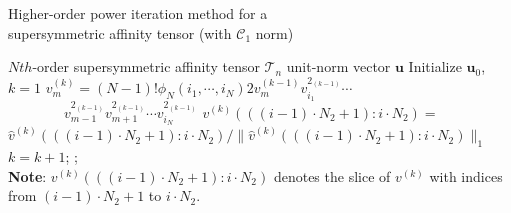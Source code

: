 \begin{algorithm}[!t]
\caption{\small Higher-order power iteration method for a \protect\\
         \mbox{}\hspace{15ex}\small supersymmetric affinity tensor (with $\mathcal{C}_1$ norm)}
\label{alg2}
\begin{algorithmic}[1]
\REQUIRE \small $Nth$-order supersymmetric affinity tensor $\mathcal{T}_n$
\ENSURE  \small unit-norm vector $\boldsymbol{u}$
\STATE   \small \; Initialize $\boldsymbol{u}_0$, $k=1$
\REPEAT
        \STATE $v_{m}^{(k)}=(N-1)!\phi_N(i_1,\cdots , i_N) 2v_{m}^{(k-1)}v_{i_1}^{2_{(k-1)}}\cdots$ \\
                 $\qquad \qquad v_{m-1}^{2_{(k-1)}}v_{m+1}^{2_{(k-1)}}\cdots v_{i_N}^{2_{(k-1)}}$
        \ENDFOR
        \STATE $v^{(k)}(((i-1)\cdot N_2+1) : i\cdot N_2)=$   \protect\\
               $\hat{v}^{(k)}(((i-1)\cdot N_2+1) : i\cdot N_2)/\lVert \hat{v}^{(k)}(((i-1)\cdot N_2+1):i\cdot N_2)\lVert_1$
        \ENDFOR
    \ENDFOR
    \STATE $k=k+1$;
;\protect\\
       \small \textbf{Note}: $v^{(k)}(((i-1)\cdot N_2+1) : i\cdot N_2)$ denotes the slice of $v^{(k)}$ with
       \small indices from $(i-1)\cdot N_2+1$ to $i\cdot N_2$.
\end{algorithmic}
\end{algorithm}

